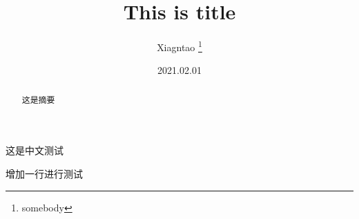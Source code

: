 \documentclass[12pt, a4paper]{article}
\title{This is title}
\author{Xiagntao \thanks{somebody} }
\date{2021.02.01}
\begin{document}
  
\begin{titlepage}
    \maketitle
\end{titlepage}

\tableofcontents

\begin{abstract}
这是摘要
\end{abstract}

\newpage
这是中文测试

增加一行进行测试
\end{document}
